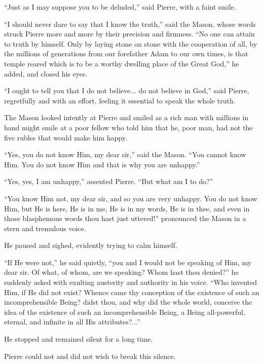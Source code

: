 ``Just as I may suppose you to be deluded,'' said Pierre, with a
faint smile.

``I should never dare to say that I know the truth,'' said the
Mason, whose words struck Pierre more and more by their precision
and firmness.  ``No one can attain to truth by himself. Only by
laying stone on stone with the cooperation of all, by the
millions of generations from our forefather Adam to our own
times, is that temple reared which is to be a worthy dwelling
place of the Great God,'' he added, and closed his eyes.

``I ought to tell you that I do not believe... do not believe in
God,'' said Pierre, regretfully and with an effort, feeling it
essential to speak the whole truth.

The Mason looked intently at Pierre and smiled as a rich man with
millions in hand might smile at a poor fellow who told him that
he, poor man, had not the five rubles that would make him happy.

``Yes, you do not know Him, my dear sir,'' said the Mason. ``You
cannot know Him. You do not know Him and that is why you are
unhappy.''

``Yes, yes, I am unhappy,'' assented Pierre. ``But what am I to
do?''

``You know Him not, my dear sir, and so you are very unhappy. You
do not know Him, but He is here, He is in me, He is in my words,
He is in thee, and even in those blasphemous words thou hast just
uttered!'' pronounced the Mason in a stern and tremulous voice.

He paused and sighed, evidently trying to calm himself.

``If He were not,'' he said quietly, ``you and I would not be
speaking of Him, my dear sir. Of what, of whom, are we speaking?
Whom hast thou denied?'' he suddenly asked with exulting
austerity and authority in his voice. ``Who invented Him, if He
did not exist? Whence came thy conception of the existence of
such an incomprehensible Being? didst thou, and why did the whole
world, conceive the idea of the existence of such an
incomprehensible Being, a Being all-powerful, eternal, and
infinite in all His attributes?...''

He stopped and remained silent for a long time.

Pierre could not and did not wish to break this silence.

